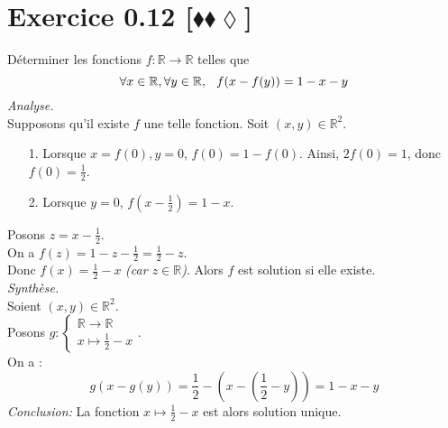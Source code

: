 \documentclass[10pt]{article}
\begin{document}
\section*{Exercice 0.12 [$\blacklozenge\blacklozenge\lozenge$]}
\begin{tcolorbox}[enhanced, width=6in, center, size=fbox, fontupper=\large, drop shadow southwest]
    Déterminer les fonctions $f: \mathbb{R} \rightarrow \mathbb{R}$ telles que 
    \begin{equation*}
        \forall{x\in\mathbb{R}},\forall{y\in\mathbb{R}}, \hspace{0.25cm} f(x-f(y)) = 1-x-y
    \end{equation*}
    \emph{Analyse.}\\
    Supposons qu'il existe $f$ une telle fonction. Soit $(x,y)\in\mathbb{R}^2$.
    \begin{itemize}
        \item[1.] Lorsque $x=f(0), y=0$, $f(0)=1-f(0)$. Ainsi, $2f(0)=1$, donc $f(0)=\frac{1}{2}$.
        \item[2.] Lorsque $y=0$, $f(x-\frac{1}{2})=1-x$.
    \end{itemize}
    Posons $z=x-\frac{1}{2}$.\\
    On a $f(z)=1-z-\frac{1}{2} = \frac{1}{2}-z$.\\
    Donc $f(x)=\frac{1}{2}-x$ \emph{(car $z\in\mathbb{R}$)}.
    Alors $f$ est solution si elle existe.\\[0.25cm]
    \emph{Synthèse.}\\
    Soient $(x,y)\in\mathbb{R}^2$.\\
    Posons $g:\begin{cases}\mathbb{R}\rightarrow\mathbb{R}\\x\mapsto{\frac{1}{2}-x}\end{cases}$.\\
    On a :
    \begin{equation*}
        g(x-g(y))=\frac{1}{2}-(x - (\frac{1}{2}-y)) = 1 - x - y
    \end{equation*}
    \emph{Conclusion:} 
    La fonction $x\mapsto\frac{1}{2}-x$ est alors solution unique.
\end{tcolorbox}
\end{document}
